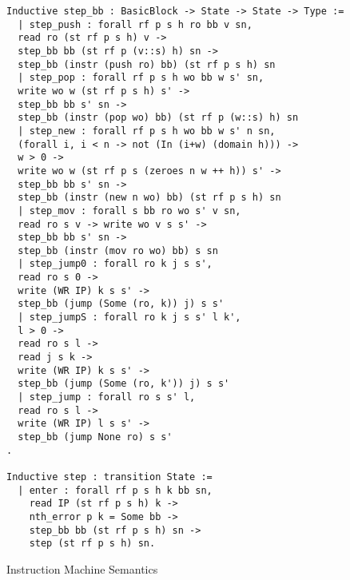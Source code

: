 \begin{figure}
\begin{lstlisting}
Inductive step_bb : BasicBlock -> State -> State -> Type :=
  | step_push : forall rf p s h ro bb v sn,
  read ro (st rf p s h) v ->
  step_bb bb (st rf p (v::s) h) sn ->
  step_bb (instr (push ro) bb) (st rf p s h) sn
  | step_pop : forall rf p s h wo bb w s' sn,
  write wo w (st rf p s h) s' ->
  step_bb bb s' sn ->
  step_bb (instr (pop wo) bb) (st rf p (w::s) h) sn
  | step_new : forall rf p s h wo bb w s' n sn,
  (forall i, i < n -> not (In (i+w) (domain h))) ->
  w > 0 ->
  write wo w (st rf p s (zeroes n w ++ h)) s' ->
  step_bb bb s' sn ->
  step_bb (instr (new n wo) bb) (st rf p s h) sn
  | step_mov : forall s bb ro wo s' v sn,
  read ro s v -> write wo v s s' ->
  step_bb bb s' sn ->
  step_bb (instr (mov ro wo) bb) s sn
  | step_jump0 : forall ro k j s s',
  read ro s 0 ->
  write (WR IP) k s s' ->
  step_bb (jump (Some (ro, k)) j) s s'
  | step_jumpS : forall ro k j s s' l k',
  l > 0 ->
  read ro s l ->
  read j s k ->
  write (WR IP) k s s' ->
  step_bb (jump (Some (ro, k')) j) s s'
  | step_jump : forall ro s s' l,
  read ro s l ->
  write (WR IP) l s s' ->
  step_bb (jump None ro) s s'
.

Inductive step : transition State :=
  | enter : forall rf p s h k bb sn,
    read IP (st rf p s h) k ->
    nth_error p k = Some bb ->
    step_bb bb (st rf p s h) sn ->
    step (st rf p s h) sn.
\end{lstlisting}
\caption{Instruction Machine Semantics}
\label{fig:im_semantics}
\end{figure}

